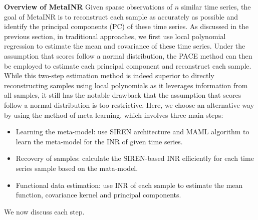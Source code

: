 \documentclass{article}
\begin{document}
\textbf{Overview of MetaINR}
Given sparse observations of $n$ similar time series, the goal of MetaINR is to reconstruct each sample as accurately as possible and identify the principal components (PC) of these time series.
As discussed in the previous section, in traditional approaches, we first use local polynomial regression to estimate the mean and covariance of these time series. 
Under the assumption that scores follow a normal distribution, the PACE method can then be employed to estimate each principal component and reconstruct each sample.
While this two-step estimation method is indeed superior to directly reconstructing samples using local polynomials as it leverages information from all samples, it still has the notable drawback that 
the assumption that scores follow a normal distribution is too restrictive.
Here, we choose an alternative way by using the method of meta-learning, which involves three main steps:
\begin{itemize}
  \item Learning the meta-model: use SIREN architecture and MAML algorithm to learn the meta-model for the INR of given time series.
  \item Recovery of samples: calculate the SIREN-based INR efficiently for each time series sample based on the mata-model.
  \item Functional data estimation: use INR of each sample to estimate the mean function, covariance kernel and principal components.
\end{itemize}
We now discuss each step.
\end{document}
